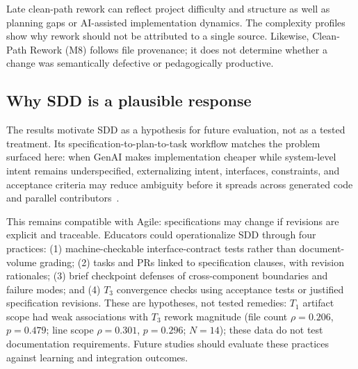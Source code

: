 Late clean-path rework can reflect project difficulty and structure as well as
planning gaps or AI-assisted implementation dynamics. The complexity profiles
show why rework should not be attributed to a single source. Likewise,
Clean-Path Rework (M8) follows file provenance; it does not determine whether a
change was semantically defective or pedagogically productive.

\subsection{Why SDD is a plausible response}

The results motivate SDD as a hypothesis for future evaluation, not as a tested
treatment. Its specification-to-plan-to-task workflow matches the problem
surfaced here: when GenAI makes implementation cheaper while system-level
intent remains underspecified, externalizing intent, interfaces, constraints,
and acceptance criteria may reduce ambiguity before it spreads across generated
code and parallel contributors~\cite{github2025spec,thoughtworks202Xspec}.

This remains compatible with Agile: specifications may change if revisions
are explicit and traceable. Educators could operationalize SDD through four
practices: (1) machine-checkable interface-contract tests rather than
document-volume grading; (2) tasks and PRs linked to specification clauses,
with revision rationales; (3) brief
checkpoint defenses of cross-component boundaries and failure modes; and (4)
$T_3$ convergence checks using acceptance tests or justified specification
revisions. These are hypotheses, not tested remedies: $T_1$ artifact scope had
weak associations with $T_3$ rework magnitude (file count $\rho=0.206$,
$p=0.479$; line scope $\rho=0.301$, $p=0.296$; $N=14$); these data do not test
documentation requirements. Future studies should evaluate these practices
against learning and integration outcomes.
